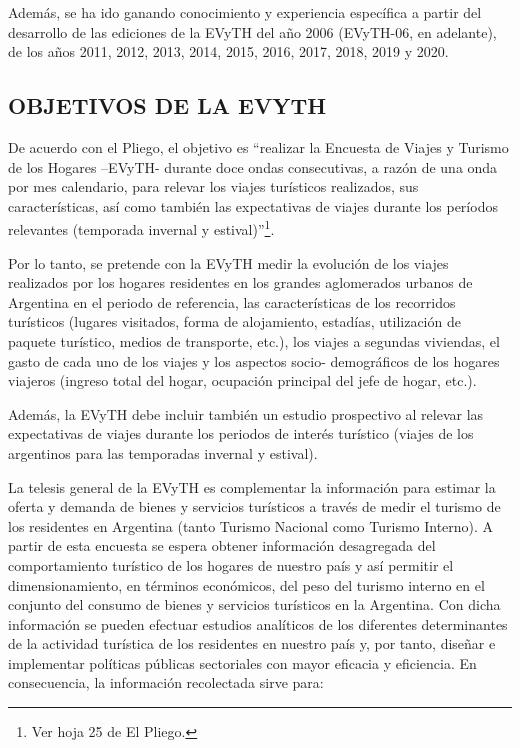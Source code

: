 \documentclass[
  openany]{book}
\begin{document}
Además, se ha ido ganando conocimiento y experiencia específica a partir
del desarrollo de las ediciones de la EVyTH del año 2006 (EVyTH-06, en
adelante), de los años 2011, 2012, 2013, 2014, 2015, 2016, 2017, 2018,
2019 y 2020.

\hypertarget{objetivos-de-la-evyth}{%
\subsection{\texorpdfstring{\textbf{OBJETIVOS DE LA EVYTH}}{OBJETIVOS DE LA EVYTH}}\label{objetivos-de-la-evyth}}

De acuerdo con el Pliego, el objetivo es ``realizar la Encuesta de Viajes
y Turismo de los Hogares --EVyTH- durante doce ondas consecutivas, a
razón de una onda por mes calendario, para relevar los viajes turísticos
realizados, sus características, así como también las expectativas de
viajes durante los períodos relevantes (temporada invernal y
estival)''\footnote{Ver hoja 25 de El Pliego.}.

Por lo tanto, se pretende con la EVyTH medir la evolución de los viajes
realizados por los hogares residentes en los grandes aglomerados urbanos
de Argentina en el periodo de referencia, las características de los
recorridos turísticos (lugares visitados, forma de alojamiento,
estadías, utilización de paquete turístico, medios de transporte, etc.),
los viajes a segundas viviendas, el gasto de cada uno de los viajes y
los aspectos socio- demográficos de los hogares viajeros (ingreso total
del hogar, ocupación principal del jefe de hogar, etc.).

Además, la EVyTH debe incluir también un estudio prospectivo al relevar
las expectativas de viajes durante los periodos de interés turístico
(viajes de los argentinos para las temporadas invernal y estival).

La telesis general de la EVyTH es complementar la información para
estimar la oferta y demanda de bienes y servicios turísticos a través de
medir el turismo de los residentes en Argentina (tanto Turismo Nacional
como Turismo Interno). A partir de esta encuesta se espera obtener
información desagregada del comportamiento turístico de los hogares de
nuestro país y así permitir el dimensionamiento, en términos económicos,
del peso del turismo interno en el conjunto del consumo de bienes y
servicios turísticos en la Argentina. Con dicha información se pueden
efectuar estudios analíticos de los diferentes determinantes de la
actividad turística de los residentes en nuestro país y, por tanto,
diseñar e implementar políticas públicas sectoriales con mayor eficacia
y eficiencia. En consecuencia, la información recolectada sirve para:
\end{document}
